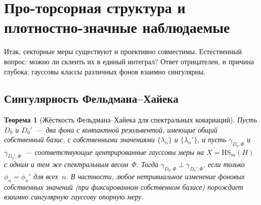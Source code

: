\documentclass[12pt,a4paper]{article}
\theoremstyle{plain}
\newtheorem{theorem}{Теорема}[section]
\theoremstyle{definition}
\theoremstyle{remark}
\newcommand{\HS}{\mathrm{HS}}
\newcommand{\sa}{\mathrm{sa}}
\begin{document}
\section{Про-торсорная структура и плотностно-значные наблюдаемые}
\label{sec:pro-torsor}

Итак, секторные меры существуют и проективно совместимы. Естественный вопрос: можно ли склеить их в единый интеграл? Ответ отрицателен, и причина глубока: гауссовы классы различных фонов взаимно сингулярны.

\subsection{Сингулярность Фельдмана--Хайека}

\begin{theorem}[Жёсткость Фельдмана--Хайека для спектральных ковариаций]
\label{thm:feldman-hajek}
Пусть $D_0$ и $D_0'$~--- два фона с компактной резольвентой,
\emph{имеющие общий собственный базис}, с собственными значениями
$\{\lambda_n\}$ и $\{\lambda_n'\}$, и пусть $\gamma_{D_0,\Phi}$ и
$\gamma_{D_0',\Phi}$~--- соответствующие центрированные гауссовы
меры на $X = \HS_\sa(H)$ с одним и тем же спектральным
весом~$\Phi$.  Тогда $\gamma_{D_0,\Phi} \perp \gamma_{D_0',\Phi}$,
если только $\phi_n = \phi_n'$ для всех~$n$.  В частности, любое
нетривиальное изменение фоновых собственных значений (при
фиксированном собственном базисе) порождает взаимно сингулярную
гауссову опорную меру.
\end{theorem}
\end{document}
